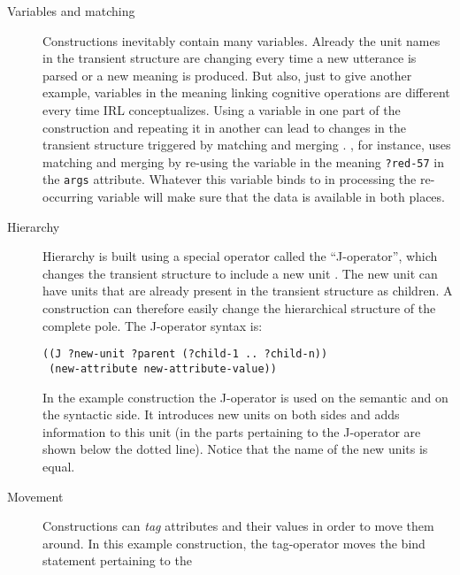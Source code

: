 \begin{description}
\item[Variables and matching] Constructions inevitably contain
many variables. Already the unit names in the transient structure
are changing every time a new utterance is parsed or a new meaning
is produced. But also, just to give another example, variables in the meaning 
linking cognitive operations are different every time IRL conceptualizes. 
Using a variable in one part of the construction and repeating it in another 
can lead to changes in the transient structure triggered
by matching and merging \citep{steels2006fcg}.
, for instance, uses matching and merging
by re-using the variable in the meaning {\footnotesize\tt ?red-57}
in the {\footnotesize\tt args} attribute. Whatever this variable binds
to in processing the re-occurring variable will make sure
that the data is available in both places.
\item[Hierarchy] Hierarchy is built using a special
operator called the ``J-operator'', which changes the
transient structure to include a new unit \citep{beule2005hierarchy}.
The new unit can have units that are already present in the 
transient structure as children. A construction can therefore 
easily change the hierarchical structure of the complete pole.
The J-operator syntax is:
\ea\label{e:j-op-syntax}
\begin{lstlisting}
((J ?new-unit ?parent (?child-1 .. ?child-n))
 (new-attribute new-attribute-value))
\end{lstlisting}\z
In the example construction the J-operator is used on the semantic
and on the syntactic side. It introduces new units on both sides 
and adds information to this unit (in 
the parts pertaining to the J-operator are shown below the dotted
line). Notice that the name of the new units is equal.
\item[Movement] Constructions can \emph{tag} attributes and
their values in order to move them around. In this example
construction, the tag-operator moves the bind statement pertaining to the

\end{description}
